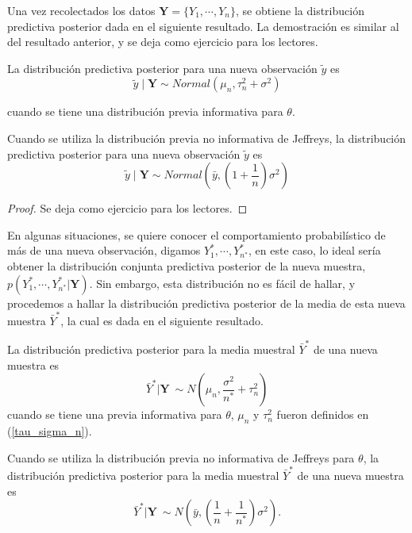 \documentclass[10pt,openright]{book}\usepackage[]{graphicx}\usepackage[]{color}
\begin{document}
    Una vez recolectados los datos $\mathbf{Y}=\{Y_1,\cdots,Y_n\}$, se obtiene la distribuci\'on predictiva posterior dada en el siguiente resultado. La demostraci\'on es similar al del resultado anterior, y se deja como ejercicio para los lectores.
    \begin{Res}\label{pred_y_theta}
    La distribuci\'on predictiva posterior para una nueva observaci\'on $\tilde{y}$ es
    \begin{equation*}
    \tilde{y} \mid \mathbf{Y} \sim Normal (\mu_n, \tau_n^2+\sigma^2)
    \end{equation*}
    
    cuando se tiene una distribuci\'on previa informativa para $\theta$. 
    
    Cuando se utiliza la distribuci\'on previa no informativa de Jeffreys, la distribuci\'on predictiva posterior para una nueva observaci\'on $\tilde{y}$ es
    \begin{equation*}
    \tilde{y} \mid \mathbf{Y} \sim Normal \left(\bar{y}, \left(1+\dfrac{1}{n}\right)\sigma^2\right)
    \end{equation*}
    \end{Res}
    
    \begin{proof}
    \label{Res_pred_normal}
    Se deja como ejercicio para los lectores.
    \end{proof}
    
    En algunas situaciones, se quiere conocer el comportamiento probabil\'istico de m\'as de una nueva observaci\'on, digamos $Y_1^*,\cdots,Y_{n^*}^*$, en este caso, lo ideal ser\'ia obtener la distribuci\'on conjunta predictiva posterior de la nueva muestra, $p(Y_1^*,\cdots,Y_{n^*}^*|\mathbf{Y})$. Sin embargo, esta distribuci\'on no es f\'acil de hallar, y procedemos a hallar la distribuci\'on predictiva posterior de la media de esta nueva muestra $\bar{Y}^*$, la cual es dada en el siguiente resultado. 
    
    \begin{Res}\label{pred_norm}
    La distribuci\'on predictiva posterior para la media muestral $\bar{Y}^*$ de una nueva muestra es 
    \begin{equation*}
    \bar{Y}^*|\mathbf{Y}\ \sim N\left(\mu_n, \frac{\sigma^2}{n^*}+\tau^2_n\right)
    \end{equation*}
    cuando se tiene una previa informativa para $\theta$, $\mu_n$ y $\tau^2_n$ fueron definidos en (\ref{tau_sigma_n}).
    
    Cuando se utiliza la distribuci\'on previa no informativa de Jeffreys para $\theta$, la distribuci\'on predictiva posterior para la media muestral $\bar{Y}^*$ de una nueva muestra es 
    \begin{equation*}
    \bar{Y}^*|\mathbf{Y}\ \sim N\left(\bar{y}, \left(\dfrac{1}{n}+\dfrac{1}{n^*}\right)\sigma^2\right).
    \end{equation*}
    \end{Res}
    
\end{document}
